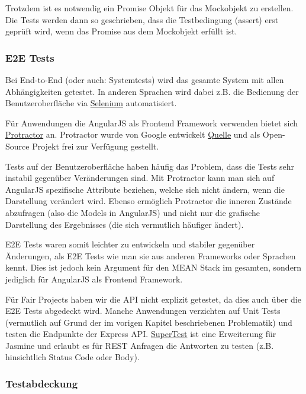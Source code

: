 Trotzdem ist es notwendig ein Promise Objekt für das Mockobjekt zu
erstellen. Die Tests werden dann so geschrieben, dass die Testbedingung
(assert) erst geprüft wird, wenn das Promise aus dem Mockobjekt erfüllt
ist.

\subsubsection{E2E Tests}\label{e2e-tests}

Bei End-to-End (oder auch: Systemtests) wird das gesamte System mit
allen Abhängigkeiten getestet. In anderen Sprachen wird dabei z.B. die
Bedienung der Benutzeroberfläche via
\href{http://www.seleniumhq.org/}{Selenium} automatisiert.

Für Anwendungen die AngularJS als Frontend Framework verwenden bietet
sich \href{http://www.protractortest.org/}{Protractor} an. Protractor
wurde von Google entwickelt
\href{http://googletesting.blogspot.de/2014/11/protractor-angular-testing-made-easy.html}{Quelle}
und als Open-Source Projekt frei zur Verfügung gestellt.

Tests auf der Benutzeroberfläche haben häufig das Problem, dass die
Tests sehr instabil gegenüber Veränderungen sind. Mit Protractor kann
man sich auf AngularJS spezifische Attribute beziehen, welche sich nicht
ändern, wenn die Darstellung verändert wird. Ebenso ermöglich Protractor
die inneren Zustände abzufragen (also die Models in AngularJS) und nicht
nur die grafische Darstellung des Ergebnisses (die sich vermutlich
häufiger ändert).

E2E Tests waren somit leichter zu entwickeln und stabiler gegenüber
Änderungen, als E2E Tests wie man sie aus anderen Frameworks oder
Sprachen kennt. Dies ist jedoch kein Argument für den MEAN Stack im
gesamten, sondern jediglich für AngularJS als Frontend Framework.

Für Fair Projects haben wir die API nicht explizit getestet, da dies
auch über die E2E Tests abgedeckt wird. Manche Anwendungen verzichten
auf Unit Tests (vermutlich auf Grund der im vorigen Kapitel
beschriebenen Problematik) und testen die Endpunkte der Express API.
\href{https://github.com/visionmedia/supertest}{SuperTest} ist eine
Erweiterung für Jasmine und erlaubt es für REST Anfragen die Antworten
zu testen (z.B. hinsichtlich Status Code oder Body).

\subsubsection{Testabdeckung}\label{testabdeckung}

